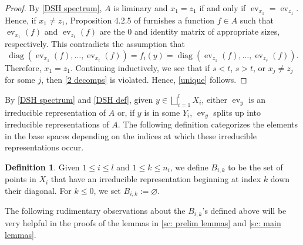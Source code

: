 \documentclass[12pt]{amsart}
\numberwithin{equation}{section}
\theoremstyle{definition}
\newtheorem{definition}[theorem]{Definition}
\theoremstyle{remark}
\newcommand{\diag}{\operatorname{diag}}
\newcommand{\ev}{\operatorname{ev}}
\begin{document}
\begin{proof}
	By \autoref{DSH spectrum}, $A$ is liminary and $x_{1}=z_{1}$ if and only if $\ev_{x_{1}}=\ev_{z_{1}}$. Hence, if $x_{1}\not=z_{1}$, Proposition 4.2.5 of \cite{dix} furnishes a function $f\in A$ such that $\ev_{x_{1}}(f)$ and $\ev_{z_{1}}(f)$ are the $0$ and identity matrix of appropriate sizes, respectively. This contradicts the assumption that
	\begin{equation}
	\label{2 decomps}
	\diag(\ev_{x_{1}}(f),\ldots,\ev_{x_{t}}(f))=f_{i}(y)=\diag(\ev_{z_{1}}(f),\ldots,\ev_{z_{s}}(f)).
	\end{equation}
	Therefore, $x_{1}=z_{1}$. Continuing inductively, we see that if $s<t$, $s>t$, or $x_{j}\not=z_{j}$ for some $j$, then \autoref{2 decomps} is violated. Hence, \autoref{unique} follows.
\end{proof}

By \autoref{DSH spectrum} and \autoref{DSH def}, given $y\in \bigsqcup_{i=1}^{ l}X_{i}$, either $\ev_{y}$ is an irreducible representation of $A$ or, if $y$ is in some $Y_{i}$, $\ev_{y}$ splits up into irreducible representations of $A$. The following definition categorizes the elements in the base spaces depending on the indices at which these irreducible representations occur.


\begin{definition}
	\label{Bik def}
	Given $1\leq i\leq  l$ and $1\leq k\leq n_{i}$, we define $B_{i,k}$ to be the set of points in $X_{i}$ that have an irreducible representation beginning at index $k$ down their diagonal. For $k\leq 0$, we set $B_{i,k}:=\varnothing$.
\end{definition}


The following rudimentary observations about the $B_{i,k}$'s defined above will be very helpful in the proofs of the lemmas in \cref{sc: prelim lemmas} and \cref{sc: main lemmas}.
\end{document}
